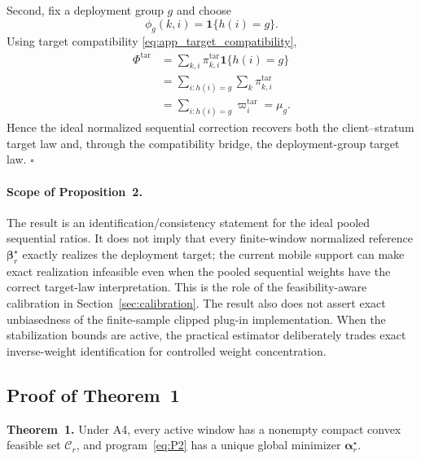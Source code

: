 \documentclass[letterpaper,journal]{IEEEtran}
\begin{document}
Second, fix a deployment group $g$ and choose
\begin{equation}
    \phi_g(k,i)
    =
    \mathbf{1}\{h(i)=g\}.
    \label{eq:app_phi_group}
\end{equation}
Using target compatibility
\eqref{eq:app_target_compatibility},
\begin{align}
 \Phi^{\mathrm{tar}}
 &=
 \sum_{k,i}
 \pi^{\mathrm{tar}}_{k,i}
 \mathbf{1}\{h(i)=g\}
 \nonumber\\
 &=
 \sum_{i:h(i)=g}
 \sum_k
 \pi^{\mathrm{tar}}_{k,i}
 \nonumber\\
 &=
 \sum_{i:h(i)=g}
 \varpi_i^{\mathrm{tar}}
 =
 \mu_g.
 \label{eq:app_recover_group}
\end{align}
Hence the ideal normalized sequential correction recovers both the
client--stratum target law and, through the compatibility bridge, the
deployment-group target law. \hfill$\square$

\paragraph{Scope of Proposition~2.}
The result is an identification/consistency statement for the ideal pooled
sequential ratios.  It does not imply that every finite-window normalized
reference $\boldsymbol\beta_r^\star$ exactly realizes the deployment target;
the current mobile support can make exact realization infeasible even when the
pooled sequential weights have the correct target-law interpretation.  This is
the role of the feasibility-aware calibration in Section~\ref{sec:calibration}.
The result also does not assert exact unbiasedness of the finite-sample clipped
plug-in implementation.  When the stabilization bounds are active, the
practical estimator deliberately trades exact inverse-weight identification for
controlled weight concentration.


\subsection{Proof of Theorem~1}
\label{app:proof_theorem1}

\noindent\textbf{Theorem~1.}
Under A4, every active window has a nonempty compact convex feasible set
$\mathcal{C}_r$, and program~\eqref{eq:P2} has a unique global minimizer
$\boldsymbol\alpha_r^\star$.
\end{document}
